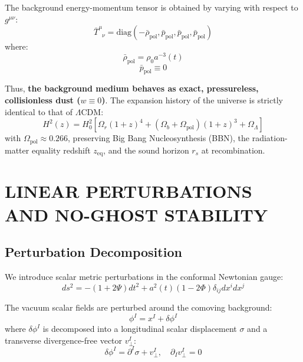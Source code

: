 \documentclass[10pt,twocolumn]{article}
\begin{document}
The background energy-momentum tensor is obtained by varying with respect to $g^{\mu\nu}$:
\begin{equation}
  \bar{T}^\mu_{\phantom{\mu}\nu} = \text{diag}(-\bar{\rho}_{\text{pol}}, \bar{p}_{\text{pol}}, \bar{p}_{\text{pol}}, \bar{p}_{\text{pol}})
\end{equation}
where:
\begin{equation}
  \bar{\rho}_{\text{pol}} = \rho_0 a^{-3}(t)
\end{equation}
\begin{equation}
  \bar{p}_{\text{pol}} \equiv 0
\end{equation}

Thus, \textbf{the background medium behaves as exact, pressureless, collisionless dust ($w \equiv 0$)}. The expansion history of the universe is strictly identical to that of $\Lambda\text{CDM}$:
\begin{equation}
  H^2(z) = H_0^2 \left[ \Omega_r (1+z)^4 + (\Omega_b + \Omega_{\text{pol}}) (1+z)^3 + \Omega_\Lambda \right]
\end{equation}
with $\Omega_{\text{pol}} \approx 0.266$, preserving Big Bang Nucleosynthesis (BBN), the radiation-matter equality redshift $z_{\text{eq}}$, and the sound horizon $r_s$ at recombination.



\section{LINEAR PERTURBATIONS AND NO-GHOST STABILITY}


\subsection{Perturbation Decomposition}

We introduce scalar metric perturbations in the conformal Newtonian gauge:
\begin{equation}
  ds^2 = -(1 + 2\Psi) dt^2 + a^2(t) (1 - 2\Phi) \delta_{ij} dx^i dx^j
\end{equation}

The vacuum scalar fields are perturbed around the comoving background:
\begin{equation}
  \phi^I = x^I + \delta \phi^I
\end{equation}
where $\delta \phi^I$ is decomposed into a longitudinal scalar displacement $\sigma$ and a transverse divergence-free vector $v_\perp^I$:
\begin{equation}
  \delta \phi^I = \partial^I \sigma + v_\perp^I, \quad \partial_I v_\perp^I = 0
\end{equation}
\end{document}
